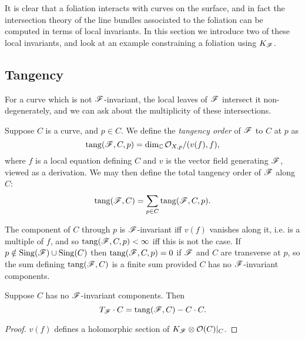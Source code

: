 
It is clear that a foliation interacts with curves on the surface, and in fact
the intersection theory of the line bundles associated to the foliation can be
computed in terms of local invariants. In this section we introduce two of these
local invariants, and look at an example constraining a foliation using
$K_{\mathscr{F}}$.

\subsection{Tangency}

For a curve which is not $\mathscr{F}$-invariant, the local leaves of $\mathscr{F}$
intersect it non-degenerately, and we can ask about the multiplicity of these
intersections.

\begin{definition}
    Suppose $C$ is a curve, and $p\in C$. We define the \emph{tangency order} of
    $\mathscr{F}$ to $C$ at $p$ as
    \begin{equation*}
        \operatorname{tang}(\mathscr{F},C,p) = \dim_{\mathbb{C}}\mathcal{O}_{X,p}/(v(f),f),
    \end{equation*}
    where $f$ is a local equation defining $C$ and $v$ is the vector field
    generating $\mathscr{F}$, viewed as a derivation. We may then define the total
    tangency order of $\mathscr{F}$ along $C$:
    \begin{equation*}
        \operatorname{tang}(\mathscr{F},C) = \sum_{p\in C}\operatorname{tang}(\mathscr{F},C,p).
    \end{equation*}
\end{definition}

\begin{remark}
    The component of $C$ through $p$ is $\mathscr{F}$-invariant iff $v(f)$ vanishes
    along it, i.e. is a multiple of $f$, and so $\operatorname{tang}(\mathscr{F},C,p)<\infty$ iff
    this is not the case. If $p\notin\operatorname{Sing}(\mathscr{F})\cup\operatorname{Sing}(C)$ then
    $\operatorname{tang}(\mathscr{F},C,p)=0$ if $\mathscr{F}$ and $C$ are transverse at $p$, so the sum
    defining $\operatorname{tang}(\mathscr{F},C)$ is a finite sum provided $C$ has no
    $\mathscr{F}$-invariant components.
\end{remark}

\begin{proposition}\label{prop:tangency}
    Suppose $C$ has no $\mathscr{F}$-invariant components. Then
    \begin{equation*}
        T_{\mathscr{F}}\cdot C = \operatorname{tang}(\mathscr{F},C) - C\cdot C.
    \end{equation*}
\end{proposition}

\begin{proof}
    $v(f)$ defines a holomorphic section of $K_{\mathscr{F}}\otimes\mathcal{O}(C)|_C$.
\end{proof}

